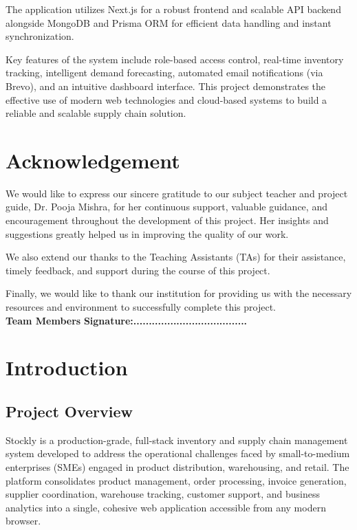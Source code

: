 \documentclass[12pt,a4paper]{report}
\begin{document}
The application utilizes Next.js for a robust frontend and scalable API backend alongside MongoDB and Prisma ORM for efficient data handling and instant synchronization. 

Key features of the system include role-based access control, real-time inventory tracking, intelligent demand forecasting, automated email notifications (via Brevo), and an intuitive dashboard interface. This project demonstrates the effective use of modern web technologies and cloud-based systems to build a reliable and scalable supply chain solution.
\newpage


\chapter*{Acknowledgement}
We would like to express our sincere gratitude to our subject teacher and project guide, Dr. Pooja Mishra, for her continuous support, valuable guidance, and encouragement throughout the development of this project. Her insights and suggestions greatly helped us in improving the quality of our work.

We also extend our thanks to the Teaching Assistants (TAs) for their assistance, timely feedback, and support during the course of this project.

Finally, we would like to thank our institution for providing us with the necessary resources and environment to successfully complete this project.\\[2cm]

\noindent
\textbf{Team Members} \hfill \textbf{Signature:.....................................}
\newpage

\tableofcontents
\newpage

\chapter{Introduction}

\section{Project Overview}

Stockly is a production-grade, full-stack inventory and supply chain management system developed to address the operational challenges faced by small-to-medium enterprises (SMEs) engaged in product distribution, warehousing, and retail. The platform consolidates product management, order processing, invoice generation, supplier coordination, warehouse tracking, customer support, and business analytics into a single, cohesive web application accessible from any modern browser.
\end{document}
